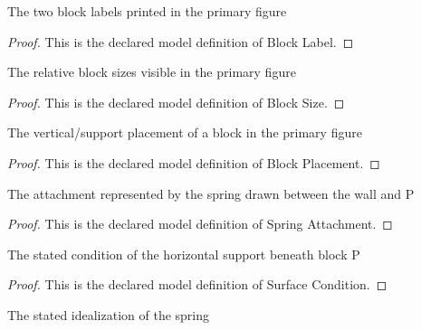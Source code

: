 \begin{definition}
  \label{def:physics:phyx-mini-0231:phyxminiproblems-problemphyxmini0231-blocklabel}
  The two block labels printed in the primary figure
\end{definition}
\begin{proof}
  This is the declared model definition of Block Label.
\end{proof}
\begin{definition}
  \label{def:physics:phyx-mini-0231:phyxminiproblems-problemphyxmini0231-blocksize}
  The relative block sizes visible in the primary figure
\end{definition}
\begin{proof}
  This is the declared model definition of Block Size.
\end{proof}
\begin{definition}
  \label{def:physics:phyx-mini-0231:phyxminiproblems-problemphyxmini0231-blockplacement}
  The vertical/support placement of a block in the primary figure
\end{definition}
\begin{proof}
  This is the declared model definition of Block Placement.
\end{proof}
\begin{definition}
  \label{def:physics:phyx-mini-0231:phyxminiproblems-problemphyxmini0231-springattachment}
  The attachment represented by the spring drawn between the wall and P
\end{definition}
\begin{proof}
  This is the declared model definition of Spring Attachment.
\end{proof}
\begin{definition}
  \label{def:physics:phyx-mini-0231:phyxminiproblems-problemphyxmini0231-surfacecondition}
  The stated condition of the horizontal support beneath block P
\end{definition}
\begin{proof}
  This is the declared model definition of Surface Condition.
\end{proof}
\begin{definition}
  \label{def:physics:phyx-mini-0231:phyxminiproblems-problemphyxmini0231-springidealization}
  The stated idealization of the spring
\end{definition}
